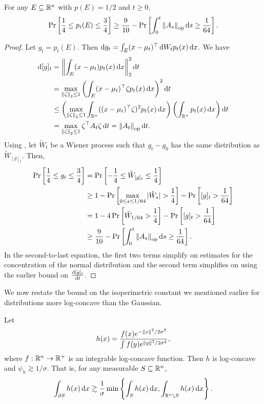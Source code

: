 		\begin{lemma}
			\label{basic estimate}
			For any $E\subseteq\mathbb{R}^n$ with $p(E) = 1/2$ and $t \geq 0$,
			\[ \Pr\left[\frac{1}{4} \leq p_t(E) \leq \frac{3}{4} \right] \geq \frac{9}{10} - \Pr\left[\int_0^t \left\lVert A_s\right\rVert_{\text{op}} \operatorname{d}\!{s} \geq \frac{1}{64}\right]. \]
		\end{lemma}
		\begin{proof}
			Let $g_t = p_t(E)$. Then $\operatorname{d}\!{g}_t = \int_E (x-\mu_t)^\top \operatorname{d}\!{W}_t p_t(x) \operatorname{d}\!{x}$. We have
			\begin{align*}
				\d{[g]_t} &= \norm{\int_E (x-\mu_t)p_t(x) \d{x}}_2^2 \d{t} \\
					&= \max_{\norm{\zeta}_2 \leq 1} \left(\int_E (x-\mu_t)^\top\zeta p_t(x) \d{x}\right)^2 \d{t} \\
					&\leq \left(\max_{\norm{\zeta}_2 \leq 1} \int_{\Rn} ((x-\mu_t)^\top\zeta)^2 p_t(x) \d{x}\right) \left(\int_{\Rn} p_t(x)\d{x}\right) \d{t} \\
					&= \max_{\norm{\zeta}_2 \leq 1} \zeta^\top A_t \zeta \d{t} = \opnorm{A_t}\d{t}.
			\end{align*}
			Using , let $\tilde{W}_t$ be a Wiener process such that $g_t - g_0$ has the same distribution as $\tilde{W}_{[g]_t}$. Then,
			\begin{align*}
				\Pr\left[\frac{1}{4} \leq g_t \leq \frac{3}{4}\right] &= \Pr\left[-\frac{1}{4} \leq \tilde{W}_{[g]_t} \leq \frac{1}{4}\right] \\
					&\geq 1 - \Pr\left[\max_{0 \leq s \leq 1/64} |\tilde{W}_s| > \frac{1}{4}\right] - \Pr\left[[g]_t > \frac{1}{64}\right] \\
					&= 1 - 4\Pr\left[\tilde{W}_{1/64} > \frac{1}{4}\right] - \Pr\left[[g]_t > \frac{1}{64}\right] \\
					&\geq \frac{9}{10} - \Pr\left[\int_0^t \left\lVert A_s\right\rVert_{\text{op}} \operatorname{d}\!{s} \geq \frac{1}{64}\right].
			\end{align*}
			In the second-to-last equation, the first two terms simplify on estimates for the concentration of the normal distribution and the second term simplifies on using the earlier bound on $\frac{\operatorname{d}\!{[g]_t}}{\operatorname{d}\!{t}}$.
		\end{proof}

		We now restate the bound on the isoperimetric constant we mentioned earlier for distributions more log-concave than the Gaussian.

		\begin{theorem}
			\label{kls for gaussian}
			Let
			\[ h(x) = \frac{f(x)e^{-\left\lVert x\right\rVert^2/2\sigma^2}}{\int f(y)e^{\left\lVert y\right\rVert^2/2\sigma^2}}, \]
			where $f:\mathbb{R}^n\to\mathbb{R}^+$ is an integrable log-concave function. Then $h$ is log-concave and $\psi_h \gtrsim 1/\sigma$. That is, for any measurable $S\subseteq\mathbb{R}^n$,
			\[ \int_{\partial S} h(x)\operatorname{d}\!{x} \gtrsim \frac{1}{\sigma} \min\left\{\int_S h(x)\operatorname{d}\!{x}, \int_{\mathbb{R}^n\setminus S}h(x)\operatorname{d}\!{x}\right\}. \]
		\end{theorem}

